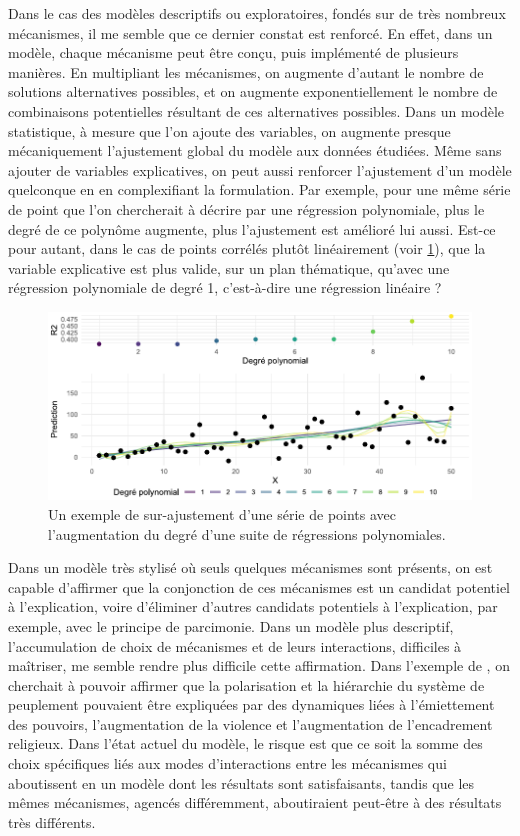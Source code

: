 Dans le cas des modèles descriptifs ou exploratoires, fondés sur de très nombreux mécanismes, il me semble que ce dernier constat est renforcé.
En effet, dans un modèle, chaque mécanisme peut être conçu, puis implémenté de plusieurs manières.
En multipliant les mécanismes, on augmente d'autant le nombre de solutions alternatives possibles, et on augmente exponentiellement le nombre de combinaisons potentielles résultant de ces alternatives possibles.
Dans un modèle statistique, à mesure que l'on ajoute des variables, on augmente presque mécaniquement l'ajustement global du modèle aux données étudiées.
Même sans ajouter de variables explicatives, on peut aussi renforcer l'ajustement d'un modèle quelconque en en complexifiant la formulation.
Par exemple, pour une même série de point que l'on chercherait à décrire par une régression polynomiale, plus le degré de ce polynôme augmente, plus l'ajustement est amélioré lui aussi.
Est-ce pour autant, dans le cas de points corrélés plutôt linéairement (voir \cref{fig:regression-polynomiale}), que la variable explicative est plus valide, sur un plan thématique, qu'avec une régression polynomiale de degré 1, c'est-à-dire une régression linéaire ?
 
\begin{figure}[H]
	\centering
	\includegraphics[width=\linewidth]{img/regression_polynomiale.pdf}
	\caption{Un exemple de sur-ajustement d'une série de points avec l'augmentation du degré d'une suite de régressions polynomiales.}
	\label{fig:regression-polynomiale}
\end{figure} 
 
Dans un modèle très stylisé où seuls quelques mécanismes sont présents, on est capable d'affirmer que la conjonction de ces mécanismes est un candidat potentiel à l'explication, voire d'éliminer d'autres candidats potentiels à l'explication, par exemple, avec le principe de parcimonie.
Dans un modèle plus descriptif, l'accumulation de choix de mécanismes et de leurs interactions, difficiles à maîtriser, me semble rendre plus difficile cette affirmation.
Dans l'exemple de \simfeodal{}, on cherchait à pouvoir affirmer que la polarisation et la hiérarchie du système de peuplement pouvaient être expliquées par des dynamiques liées à l'émiettement des pouvoirs, l'augmentation de la violence et l'augmentation de l'encadrement religieux.
Dans l'état actuel du modèle, le risque est que ce soit la somme des choix spécifiques liés aux modes d'interactions entre les mécanismes qui aboutissent en un modèle dont les résultats sont satisfaisants, tandis que les mêmes mécanismes, agencés différemment, aboutiraient peut-être à des résultats très différents.

